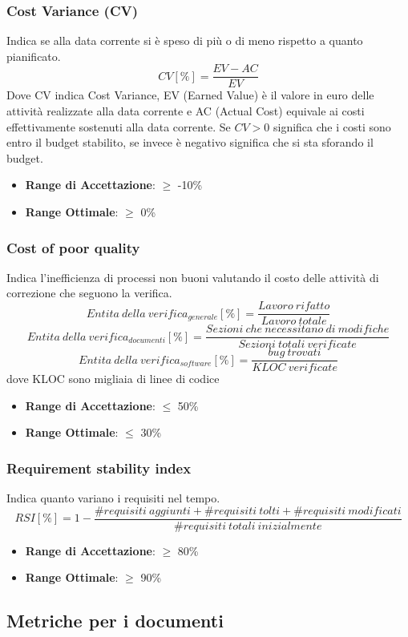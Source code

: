 \documentclass[12pt,a4paper]{article}
\begin{document}
\subsubsection{Cost Variance (CV)}
Indica se alla data corrente si è speso di più o di meno rispetto a quanto pianificato.
\[CV [\%] = \frac{EV - AC}{EV}\]
Dove CV indica Cost Variance, EV (Earned Value) è il valore in euro delle attività realizzate alla data corrente e AC (Actual Cost) equivale ai costi effettivamente sostenuti alla data corrente.
Se $CV > 0$ significa che i costi sono entro il budget stabilito, se invece è negativo significa che si sta sforando il budget.
\begin{itemize}
\item \textbf{Range di Accettazione}: $\geq$ -10\%
\item \textbf{Range Ottimale}: $\geq$ 0\%
\end{itemize}
\subsubsection{Cost of poor quality}
Indica l'inefficienza di processi non buoni valutando il costo delle attività di correzione che seguono la verifica.
	\[Entita\ della\ verifica_{generale}[\%]= \frac{Lavoro\ rifatto}{Lavoro\ totale}\]
	\[Entita\ della\ verifica_{documenti}[\%]= \frac{Sezioni\ che\ necessitano\ di\ modifiche}{Sezioni\ totali\ verificate}\]
	\[Entita\ della\ verifica_{software}[\%]= \frac{bug\ trovati}{KLOC\ verificate}\]
dove KLOC sono migliaia di linee di codice
\begin{itemize}
	\item \textbf{Range di Accettazione}: $\leq$ 50\%
	\item \textbf{Range Ottimale}: $\leq$ 30\%
\end{itemize}
\subsubsection{Requirement stability index}
Indica quanto variano i requisiti nel tempo.
\[RSI[\%]= 1 - \frac{\#requisiti\ aggiunti+\#requisiti\ tolti+\#requisiti\ modificati}{\#requisiti\ totali\ inizialmente}\]
\begin{itemize}
	\item \textbf{Range di Accettazione}: $\geq$ 80\%
	\item \textbf{Range Ottimale}: $\geq$ 90\%
\end{itemize}
\subsection{Metriche per i documenti}\label{metriche_doc}
\end{document}
